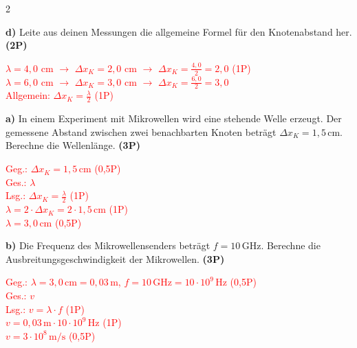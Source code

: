 \documentclass[11pt,a4paper]{article}
\begin{document}
\begin{multicols}{2}
\begin{tcolorbox}[colback=white,colframe=black,coltitle=black,colbacktitle=white,
    title=\textbf{2: Knoten und Bäuche}]
\vspace{0.3cm}

\textbf{d)} Leite aus deinen Messungen die allgemeine Formel für den Knotenabstand her. \textbf{(2P)}

\textcolor{red}{$\lambda = 4{,}0$ cm $\rightarrow$ $\Delta x_K = 2{,}0$ cm $\rightarrow$ $\Delta x_K = \frac{4{,}0}{2} = 2{,}0$ {\color{blue}(1P)}\\
$\lambda = 6{,}0$ cm $\rightarrow$ $\Delta x_K = 3{,}0$ cm $\rightarrow$ $\Delta x_K = \frac{6{,}0}{2} = 3{,}0$\\[0.2cm]
Allgemein: $\boxed{\Delta x_K = \frac{\lambda}{2}}$ {\color{blue}(1P)}}

\end{tcolorbox}

\columnbreak

\begin{tcolorbox}[colback=white,colframe=black,coltitle=black,colbacktitle=white,
    title=\textbf{3: Wellenlängenbestimmung mit Mikrowellen}]

\textbf{a)} In einem Experiment mit Mikrowellen wird eine stehende Welle erzeugt. Der gemessene Abstand zwischen zwei benachbarten Knoten beträgt $\Delta x_K = 1{,}5\,\mathrm{cm}$. Berechne die Wellenlänge. \textbf{(3P)}

\textcolor{red}{Geg.: $\Delta x_K = 1{,}5\,\mathrm{cm}$ {\color{blue}(0,5P)}\\
Ges.: $\lambda$\\[0.2cm]
Lsg.: $\Delta x_K = \frac{\lambda}{2}$ {\color{blue}(1P)}\\[0.1cm]
$\lambda = 2 \cdot \Delta x_K = 2 \cdot 1{,}5\,\mathrm{cm}$ {\color{blue}(1P)}\\[0.1cm]
$\boxed{\lambda = 3{,}0\,\mathrm{cm}}$ {\color{blue}(0,5P)}}

\vspace{0.3cm}

\textbf{b)} Die Frequenz des Mikrowellensenders beträgt $f = 10\,\mathrm{GHz}$. Berechne die Ausbreitungsgeschwindigkeit der Mikrowellen. \textbf{(3P)}

\textcolor{red}{Geg.: $\lambda = 3{,}0\,\mathrm{cm} = 0{,}03\,\mathrm{m}$, $f = 10\,\mathrm{GHz} = 10 \cdot 10^9\,\mathrm{Hz}$ {\color{blue}(0,5P)}\\
Ges.: $v$\\[0.2cm]
Lsg.: $v = \lambda \cdot f$ {\color{blue}(1P)}\\[0.1cm]
$v = 0{,}03\,\mathrm{m} \cdot 10 \cdot 10^9\,\mathrm{Hz}$ {\color{blue}(1P)}\\[0.1cm]
$\boxed{v = 3 \cdot 10^8\,\mathrm{m/s}}$ {\color{blue}(0,5P)}}


\end{tcolorbox}
\end{multicols}
\end{document}
